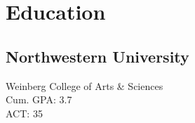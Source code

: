 
\section{Education}

\subsection{Northwestern University}
Weinberg College of Arts \& Sciences
\\ Cum. GPA: 3.7
\\ ACT: 35
\sectionsep

